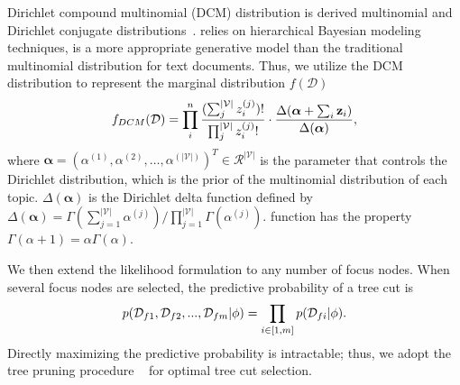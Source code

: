  Dirichlet compound multinomial (DCM) distribution is derived  multinomial and Dirichlet conjugate distributions~\cite{Liu2012a}.
  relies on hierarchical Bayesian modeling techniques,  is a more appropriate generative model than the traditional multinomial distribution for text documents.
Thus, we utilize the DCM distribution to represent the marginal distribution $f(\mathcal{D})$ 
\begin{equation}
\label{eq:dcm}
f_{DCM}(\mathcal{D}) =  \prod_i^n \frac{(\sum_j^{|\mathcal{V}|}z_i^{(j)})!}{\prod_j^{|\mathcal{V}|} z_i^{(j)}!} \cdot \frac{\Delta({\bm \alpha}+\sum_i\bold{z}_i)}{\Delta({\bm \alpha})},
\end{equation}
where  %
${\bm \alpha} = (\alpha^{(1)},\alpha^{(2)},\ldots,\alpha^{(|\mathcal{V}|)})^T \in \mathcal{R}^{|\mathcal{V}|}$ is the parameter that controls the Dirichlet distribution, which is the prior of the multinomial distribution of each topic.
$\Delta({\bm \alpha})$ is the Dirichlet delta function defined by $\Delta({\bm \alpha}) =\Gamma(\sum_{j=1}^{|\mathcal{V}|} \alpha^{(j)})/\prod_{j=1}^{|\mathcal{V}|} \Gamma(\alpha^{(j)})$.
 function has the property $\Gamma(\alpha+1) = \alpha\Gamma(\alpha)$.

We then extend the likelihood formulation to any number of focus nodes.
When several focus nodes are selected, the predictive probability of a tree cut is 
\begin{equation}
\small
p(\mathcal{D}_{f1}, \mathcal{D}_{f2}, ..., \mathcal{D}_{fm}|\phi) = \prod_{i\in [1, m]} p(\mathcal{D}_{fi}|\phi).
\end{equation}
Directly maximizing the  predictive probability is intractable; thus, we adopt the tree pruning procedure ~\cite{He2003} for optimal tree cut selection.



